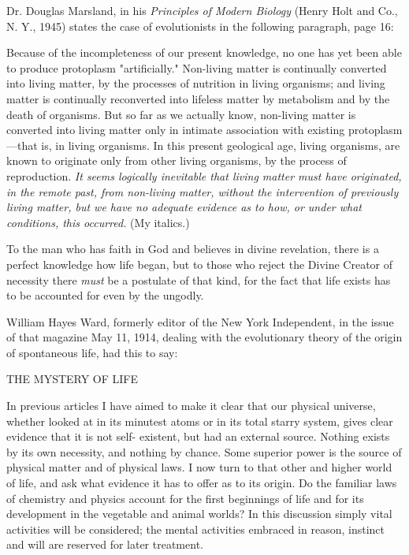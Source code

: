 Dr. Douglas Marsland, in his \textit{Principles of Modern Biology} (Henry Holt and Co., N. Y.,
1945) states the case of evolutionists in the following paragraph, page 16:

Because of the incompleteness of our present knowledge, no one has yet been able to
produce protoplasm "artificially." Non-living matter is continually converted into living
matter, by the processes of nutrition in living organisms; and living matter is continually
reconverted into lifeless matter by metabolism and by the death of organisms. But so far as
we actually know, non-living matter is converted into living matter only in intimate
association with existing protoplasm—that is, in living organisms. In this present geological
age, living organisms, are known to originate only from other living organisms, by the
process of reproduction. \textit{It seems logically inevitable that living matter must have originated,
in the remote past, from non-living matter, without the intervention of previously living
matter, but we have no adequate evidence as to how, or under what conditions, this
occurred.} (My italics.)

To the man who has faith in God and believes in divine revelation, there is a perfect
knowledge how life began, but to those who reject the Divine Creator of necessity there \textit{must}
be a postulate of that kind, for the fact that life exists has to be accounted for even by the
ungodly.

William Hayes Ward, formerly editor of the New York Independent, in the issue of that
magazine May 11, 1914, dealing with the evolutionary theory of the origin of spontaneous
life, had this to say:

THE MYSTERY OF LIFE

In previous articles I have aimed to make it clear that our physical universe, whether looked
at in its minutest atoms or in its total starry system, gives clear evidence that it is not self-
existent, but had an external source. Nothing exists by its own necessity, and nothing by
chance. Some superior power is the source of physical matter and of physical laws. I now
turn to that other and higher world of life, and ask what evidence it has to offer as to its
origin. Do the familiar laws of chemistry and physics account for the first beginnings of life
and for its development in the vegetable and animal worlds? In this discussion simply vital
activities will be considered; the mental activities embraced in reason, instinct and will are
reserved for later treatment.

